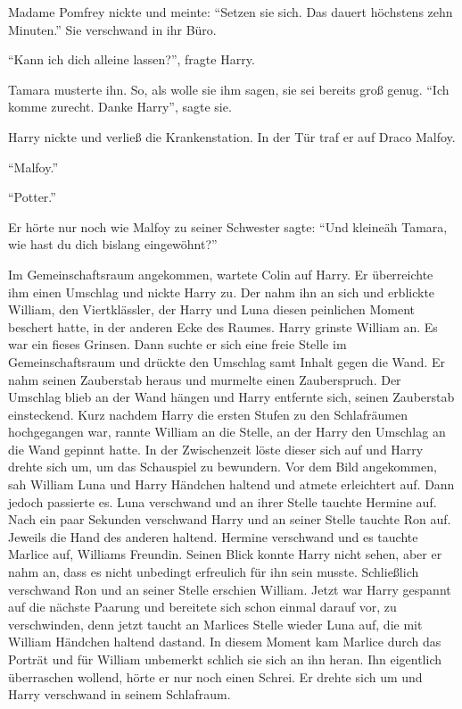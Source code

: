 Madame Pomfrey nickte und meinte: \enquote{Setzen sie sich. Das dauert höchstens zehn Minuten.} Sie verschwand in ihr Büro.

\enquote{Kann ich dich alleine lassen?}, fragte Harry.

Tamara musterte ihn. So, als wolle sie ihm sagen, sie sei bereits groß genug. \enquote{Ich komme zurecht. Danke Harry}, sagte sie.

Harry nickte und verließ die Krankenstation. In der Tür traf er auf Draco Malfoy.

\enquote{Malfoy.}

\enquote{Potter.}

Er hörte nur noch wie Malfoy zu seiner Schwester sagte: \enquote{Und kleine\abs äh Tamara, wie hast du dich bislang eingewöhnt?}

Im Gemeinschaftsraum angekommen, wartete Colin auf Harry. Er überreichte ihm einen Umschlag und nickte Harry zu. Der nahm ihn an sich und erblickte William, den Viertklässler, der Harry und Luna diesen peinlichen Moment beschert hatte, in der anderen Ecke des Raumes. Harry grinste William an. Es war ein fieses Grinsen. Dann suchte er sich eine freie Stelle im Gemeinschaftsraum und drückte den Umschlag samt Inhalt gegen die Wand. Er nahm seinen Zauberstab heraus und murmelte einen Zauberspruch. Der Umschlag blieb an der Wand hängen und Harry entfernte sich, seinen Zauberstab einsteckend. Kurz nachdem Harry die ersten Stufen zu den Schlafräumen hochgegangen war, rannte William an die Stelle, an der Harry den Umschlag an die Wand gepinnt hatte. In der Zwischenzeit löste dieser sich auf und Harry drehte sich um, um das Schauspiel zu bewundern. Vor dem Bild angekommen, sah William Luna und Harry Händchen haltend und atmete erleichtert auf. Dann jedoch passierte es. Luna verschwand und an ihrer Stelle tauchte Hermine auf. Nach ein paar Sekunden verschwand Harry und an seiner Stelle tauchte Ron auf. Jeweils die Hand des anderen haltend. Hermine verschwand und es tauchte Marlice auf, Williams Freundin. Seinen Blick konnte Harry nicht sehen, aber er nahm an, dass es nicht unbedingt erfreulich für ihn sein musste. Schließlich verschwand Ron und an seiner Stelle erschien William. Jetzt war Harry gespannt auf die nächste Paarung und bereitete sich schon einmal darauf vor, zu verschwinden, denn jetzt taucht an Marlices Stelle wieder Luna auf, die mit William Händchen haltend dastand. In diesem Moment kam Marlice durch das Porträt und für William unbemerkt schlich sie sich an ihn heran. Ihn eigentlich überraschen wollend, hörte er nur noch einen Schrei. Er drehte sich um und Harry verschwand in seinem Schlafraum.

